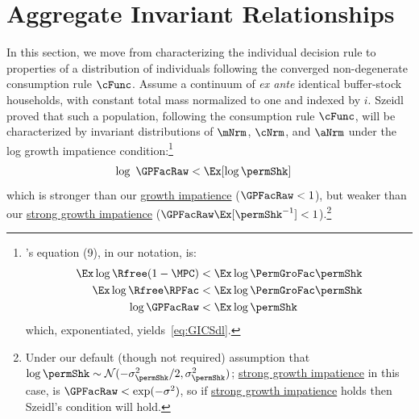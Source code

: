 \documentclass[BufferStockTheory]{subfiles}
\begin{document}
\section{Aggregate Invariant Relationships}
In this section, we move from characterizing the individual decision rule to properties of a distribution of individuals following the converged non-degenerate consumption rule $\cFunc$.
Assume a continuum of \textit{ex ante} identical buffer-stock households, with constant total mass normalized to one and indexed by $i$.
Szeidl~\citeyearpar{szeidlInvariant} proved that such a population, following the consumption rule $\cFunc$, will be characterized by invariant distributions of $\mNrm$, $\cNrm$, and $\aNrm$ under the log growth impatience condition:\footnote{\cite{szeidlInvariant}'s equation (9), in our notation, is:
  \begin{equation}\begin{gathered}\begin{aligned}
    \Ex \log \Rfree (1-\MPC) & < \Ex \log \PermGroFac \permShk
    \\  \Ex \log \Rfree \RPFac  &  < \Ex \log \PermGroFac \permShk
    \\ \log \GPFacRaw & < \Ex \log \permShk
  \end{aligned}\end{gathered}\end{equation}
  which, exponentiated, yields~\eqref{eq:GICSdl}.}
\hypertarget{GICSdl}{}
\begin{equation}\begin{gathered}\begin{aligned}
   \log~\GPFacRaw & < \Ex [\log \permShk] \label{eq:GICSdl}
\end{aligned}\end{gathered}\end{equation}
which is stronger than our \hyperlink{GICRaw}{growth impatience} ($\GPFacRaw < 1$), but weaker than our \hyperlink{GICMod}{strong growth impatience}  ($\GPFacMod < 1$).\footnote{Under our default (though not required) assumption that $\log \permShk \sim \mathcal{N}(-\sigma^{2}_{\permShk}/2,\sigma^{2}_{\permShk})$; \hyperlink{GICMod}{strong growth impatience} in this case, is $\GPFacRaw < \exp(-\sigma^{2})$, so if \hyperlink{GICMod}{strong growth impatience} holds then Szeidl's condition will hold.}

\hypertarget{Growth-Rates-of-Aggregate-Income-and-Consumption}{}
\end{document}
